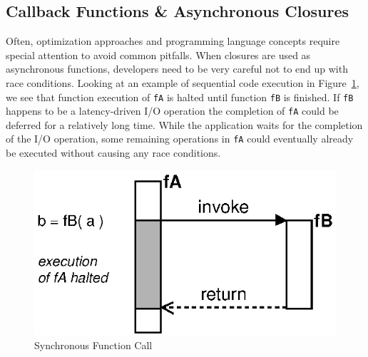 \subsection{Callback Functions \& Asynchronous Closures}
Often, optimization approaches and programming language concepts require special attention to avoid common pitfalls.
When closures are used as asynchronous functions, developers need to be very careful not to end up with race conditions.
Looking at an example of sequential code execution in Figure~\ref{fig:Closures_Synchronous}, we see that function execution of \texttt{fA} is halted until function \texttt{fB} is finished.
If \texttt{fB} happens to be a latency-driven I/O operation the completion of \texttt{fA} could be deferred for a relatively long time.
While the application waits for the completion of the I/O operation, some remaining operations in \texttt{fA} could eventually already be executed without causing any race conditions.
\begin{figure}[!ht]
	\centering
  \includegraphics{figures/Closures_Synchronous}
	\caption{Synchronous Function Call}
	\label{fig:Closures_Synchronous}
\end{figure}

